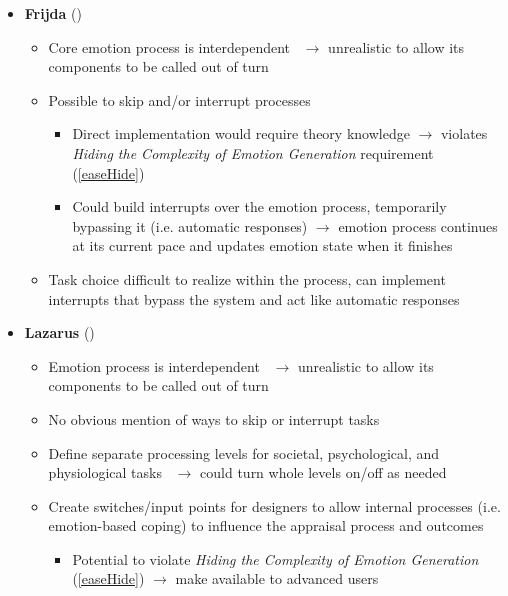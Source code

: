 \begin{itemize}
    \item \textbf{Frijda} (\weak)
    \begin{itemize}
        \item Core emotion process is
        interdependent~\citep[p.~454]{frijda1986emotions} $\rightarrow$
        unrealistic to allow its components to be called out of turn

        \item Possible to skip and/or interrupt
        processes~\citep[p.~461--463]{frijda1986emotions}
        \begin{itemize}
            \item Direct implementation would require theory knowledge
            $\rightarrow$ violates \textit{Hiding the Complexity of Emotion
                Generation} requirement (\ref{easeHide})

            \item Could build interrupts over the emotion process, temporarily
            bypassing it (i.e. automatic responses) $\rightarrow$ emotion
            process continues at its current pace and updates emotion state
            when it finishes
        \end{itemize}

        \item Task choice difficult to realize within the process, can
        implement interrupts that bypass the system and act like automatic
        responses
    \end{itemize}

    \item \textbf{Lazarus} (\weak)
    \begin{itemize}
        \item Emotion process is
        interdependent~\citep[p.~39, 208--211]{lazarus1991emotion}
        $\rightarrow$ unrealistic to allow its components to be called out of
        turn

        \item No obvious mention of ways to skip or interrupt tasks

        \item Define separate processing levels for societal, psychological,
        and physiological tasks~\citep[p.~211]{lazarus1991emotion}
        $\rightarrow$ could turn whole levels on/off as needed

        \item Create switches/input points for designers to allow internal
        processes (i.e. emotion-based coping) to influence the appraisal
        process and outcomes~\citep[p.~210]{lazarus1991emotion}
        \begin{itemize}
            \item Potential to violate \textit{Hiding the Complexity of Emotion
                Generation} (\ref{easeHide}) $\rightarrow$ make available to
            advanced users
        \end{itemize}
    \end{itemize}


\end{itemize}

